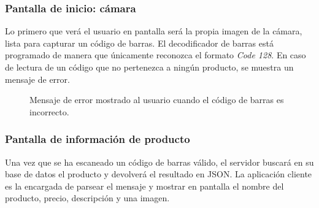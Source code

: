 
\subsubsection{Pantalla de inicio: cámara}
Lo primero que verá el usuario en pantalla será la propia imagen de la cámara, lista para capturar un código de barras. El decodificador de barras está programado de manera que únicamente reconozca el formato \emph{Code 128}. En caso de lectura de un código que no pertenezca a ningún producto, se muestra un mensaje de error.

\begin{figure}[H]
	\centering
	\caption{Mensaje de error mostrado al usuario cuando el código de barras es incorrecto.}
	\label{fig:codigoBarrasError}
\end{figure}

\subsubsection{Pantalla de información de producto} \label{sssec:pantalla-info-producto}
Una vez que se ha escaneado un código de barras válido, el servidor buscará en su base de datos el producto y devolverá el resultado en JSON. La aplicación cliente es la encargada de parsear el mensaje y mostrar en pantalla el nombre del producto, precio, descripción y una imagen.

